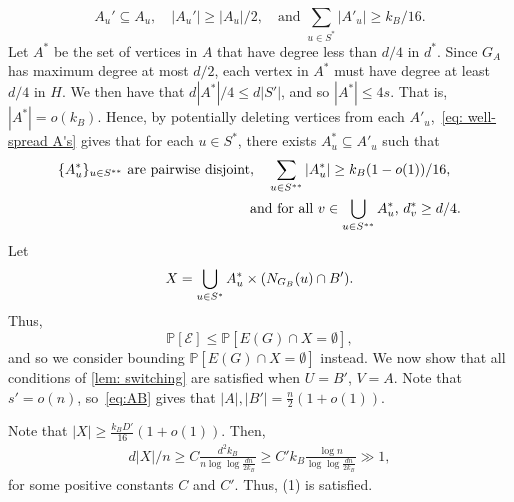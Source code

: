 \documentclass[11pt]{article}
\def\P{\mathbb P}
\theoremstyle{plain}
\begin{document}
\begin{equation}\label{eq: well-spread A's}
    A_u' \subseteq A_u, \quad |A_u'| \geq |A_u|/2,\quad  \text{and } \sum_{u \in S^*}|A'_u| \geq k_B/16.
\end{equation}
Let $A^*$ be the set of vertices in $A$ that have degree less than $d/4$ in $d^*$. Since $G_A$ has maximum degree at most $d/2$, each vertex in $A^*$ must have degree at least $d/4$ in $H$. We then have that $d|A^*|/4 \leq d|S'|$, and so $|A^*| \leq 4s$. That is, $|A^*| = o(k_B)$. Hence, by potentially deleting vertices from each $A'_u$,~\eqref{eq: well-spread A's} gives that for each $u \in S^*$, there exists $A^*_u \subseteq A'_u$ such that 
\begin{align}
    \{A^*_u\}_{u \in S^{**}} \text{ are pairwise disjoint}&, \quad \sum_{u \in S^{**}}|A^*_u| \geq k_B(1 - o(1))/16,\notag \\ &\text{and for all $v \in \bigcup_{u \in S^{**}}A^*_u$,  } d^*_v \geq d/4. \label{eq: A* properties}
\end{align}
Let 
\begin{equation}\notag
    X = \bigcup_{u \in S^*}A^*_u \times (N_{G_B}(u) \cap B').
\end{equation}
Thus, 
\[
\P[\mathcal E] \leq \P[E(G) \cap X = \emptyset],
\]
and so we consider bounding $\P[E(G) \cap X = \emptyset]$ instead. We now show that all conditions of \cref{lem: switching} are satisfied when $U = B'$, $V = A$. Note that $s' = o(n)$, so~\eqref{eq:AB} gives that $|A|,|B'| = \frac{n}{2}(1 + o(1))$. 

Note that $|X| \geq \frac{k_BD'}{16}(1 + o(1))$. Then, 
\begin{align*}
    d|X|/n \geq C\frac{d^2k_B}{n\log\log\frac{dn}{2k_B}} \geq C'k_B\frac{\log n}{\log\log\frac{dn}{2k_B}} \gg 1,
\end{align*}
for some positive constants $C$ and $C'$. Thus, (1) is satisfied.
\end{document}
